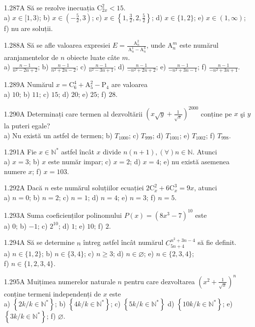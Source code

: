 \documentclass[11pt]{article}
\begin{document}
1.287A Să se rezolve inecuația $\mathrm{C}_{2 x}^{2}<15$.\\ a) $x \in[1,3)$; b) $x \in\left(-\frac{5}{2}, 3\right)$; c) $x \in\left\{1, \frac{3}{2}, 2, \frac{5}{2}\right\}$; d) $x \in\{1,2\}$; e) $x \in(1, \infty)$; f) nu are soluții.

1.288A Să se afle valoarea expresiei $E=\frac{\mathrm{A}_{n}^{2}}{\mathrm{~A}_{n}^{1}-\mathrm{A}_{n}^{3}}$, unde $\mathrm{A}_{n}^{m}$ este numărul aranjamentelor de $n$ obiecte luate câte $m$.\\ a) $\frac{n-1}{n^{2}-2 n+2}$; b) $\frac{n-1}{n^{2}+2 n-2}$; c) $\frac{n-1}{n^{2}-3 n+1}$; d) $\frac{n-1}{-n^{2}+2 n+2}$; e) $\frac{n-1}{-n^{2}+3 n-1}$; f) $\frac{n-1}{-n^{2}+3 n+1}$.

1.289A Numărul $x=\mathrm{C}_{6}^{4}+\mathrm{A}_{5}^{2}-\mathrm{P}_{4}$ are valoarea\\ a) $10$; b) $11$; c) $15$; d) $20$; e) $25$; f) $28$.

1.290A Determinați care termen al dezvoltării $\left(x \sqrt{y}+\frac{1}{\sqrt{x}}\right)^{2000}$ conține pe $x$ şi $y$ la puteri egale?\\ a) Nu există un astfel de termen; b) $T_{1000}$; c) $T_{999}$; d) $T_{1001}$; e) $T_{1002}$; f) $T_{998}$.

1.291A Fie $x \in \mathbb{N}^{*}$ astfel încât $x$ divide $n(n+1),(\forall) n \in \mathbb{N}$. Atunci\\ a) $x=3$; b) $x$ este număr impar; c) $x=2$; d) $x=4$; e) nu există asemenea numere $x$; f) $x=103$.

1.292A Dacă $n$ este numărul soluțiilor ecuației $2 \mathrm{C}_{x}^{2}+6 \mathrm{C}_{x}^{3}=9 x$, atunci\\ a) $n=0$; b) $n=2$; c) $n=1$; d) $n=4$; e) $n=3$; f) $n=5$.

1.293A Suma coeficienților polinomului $P(x)=\left(8 x^{3}-7\right)^{10}$ este\\ a) $0$; b) $-1$; c) $2^{10}$; d) $1$; e) $10$; f) $2$.

1.294A Să se determine $n$ întreg astfel încât numărul $C_{5 n+4}^{n^{2}+3 n-4}$ să fie definit.\\ a) $n \in\{1,2\}$; b) $n \in\{3,4\}$; c) $n \geq 3$; d) $n \in \varnothing$; e) $n \in\{2,3,4\}$;\\ f) $n \in\{1,2,3,4\}$. 

1.295A Muițimea numerelor naturale $n$ pentru care dezvoltarea $\left(x^{2}+\frac{1}{\sqrt{x}}\right)^{n}$ conține termeni independenți de $x$ este\\ a) $\left\{2 k / k \in \mathbb{N}^{*}\right\}$; b) $\left\{4 k / k \in \mathbb{N}^{*}\right\}$; c) $\left\{5 k / k \in \mathbb{N}^{*}\right\}$  d) $\left\{10 k / k \in \mathbb{N}^{*}\right\}$; e) $\left\{3 k / k \in \mathbb{N}^{*}\right\}$; f) $\varnothing$.
\end{document}
